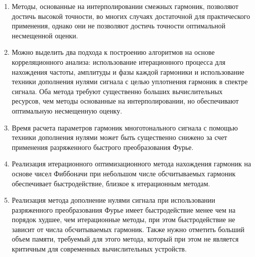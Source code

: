\begin{enumerate}
\item Методы, основанные на интерполировании смежных гармоник, позволяют достичь высокой точности, во многих случаях достаточной для практического применения, однако они не позволяют достичь точности оптимальной несмещенной оценки.

\item Можно выделить два подхода к построению алгоритмов на основе корреляционного анализа: использование итерационного процесса для нахождения частоты, амплитуды и фазы каждой гармоники и использование техники дополнения нулями сигнала с целью уплотнения гармоник в спектре сигнала. Оба метода требуют существенно больших вычислительных ресурсов, чем методы основанные на интерполировании, но обеспечивают оптимальную несмещенную оценку.

\item Время расчета параметров гармоник многотонального сигнала с помощью техники дополнения нулями может быть существенно снижено за счет применения разряженного быстрого преобразования Фурье.

\item Реализация итерационного оптимизационного метода нахождения гармоник на основе чисел Фиббоначи при небольшом числе обсчитываемых гармоник обеспечивает быстродействие, близкое к итерационным методам. 

\item Реализация метода дополнение нулями сигнала при использовании разряженного преобразования Фурье имеет быстродействие менее чем на порядок худшее, чем итерационные методы, при этом быстродействие не зависит от числа обсчитываемых гармоник. Также нужно отметить больший объем памяти, требуемый для этого метода, который при этом не является критичным для современных вычислительных устройств.
\end{enumerate}
